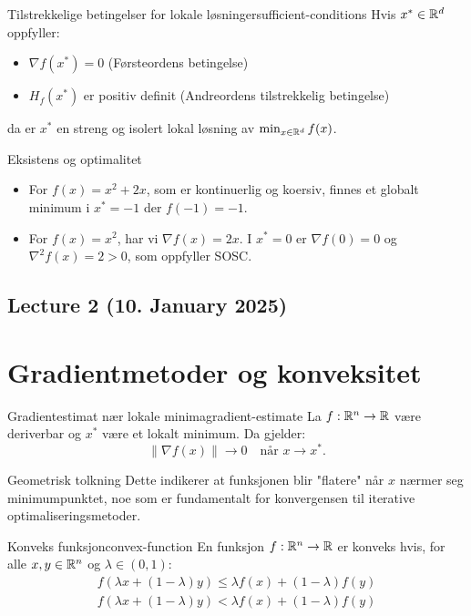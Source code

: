 \begin{theorem}{Tilstrekkelige betingelser for lokale løsninger}{sufficient-conditions}
  Hvis  \(x^* \in \mathbb{R}^d\) oppfyller:
  \begin{itemize}
    \item  \(\nabla f(x^*) = 0\) (Førsteordens betingelse)
    \item  \(H_f(x^*)\) er positiv definit (Andreordens tilstrekkelig betingelse)
  \end{itemize}
  da er  \(x^*\) en streng og isolert lokal løsning av  \(\min_{x \in \mathbb{R}^d} f(x)\).
\end{theorem}

\begin{example}{Eksistens og optimalitet}{}
  \begin{itemize}
    \item For \( f(x) = x^2 + 2x \), som er kontinuerlig og koersiv, finnes et globalt minimum i \( x^* = -1 \) der \( f(-1) = -1 \).
    \item For \( f(x) = x^2 \), har vi \( \nabla f(x) = 2x \). I \( x^* = 0 \) er \( \nabla f(0) = 0 \) og \( \nabla^2 f(x) = 2 > 0 \), som oppfyller SOSC.
  \end{itemize}
\end{example}

\subsection{Lecture 2 (10. January 2025)}

\section*{Gradientmetoder og konveksitet}

\begin{theorem}{Gradientestimat nær lokale minima}{gradient-estimate}
  La  \(f: \mathbb{R}^n \to \mathbb{R}\) være deriverbar og  \(x^*\) være et lokalt minimum. Da gjelder:
  \[
    \|\nabla f(x)\| \to 0 \quad \text{når } x \to x^*.
  \]
\end{theorem}

\begin{remark}{Geometrisk tolkning}
  Dette indikerer at funksjonen blir "flatere" når  \(x\) nærmer seg minimumpunktet, noe som er fundamentalt for konvergensen til iterative optimaliseringsmetoder.
\end{remark}

\begin{definition}{Konveks funksjon}{convex-function}
  En funksjon  \(f: \mathbb{R}^n \to \mathbb{R}\) er konveks hvis, for alle  \(x, y \in \mathbb{R}^n\) og  \(\lambda \in (0,1)\):
  \begin{align*}
    f(\lambda x + (1 - \lambda)y) \leq \lambda f(x) + (1 - \lambda)f(y) \tag{Konveks} \\
    f(\lambda x + (1 - \lambda)y) < \lambda f(x) + (1 - \lambda)f(y) \tag{Strengt konveks}
  \end{align*}

\end{definition}

